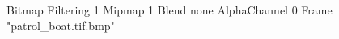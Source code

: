 {Bitmap
	{Filtering 1}
	{Mipmap 1}
	{Blend none}
	{AlphaChannel 0}
	{Frame "patrol_boat.tif.bmp"}
}
